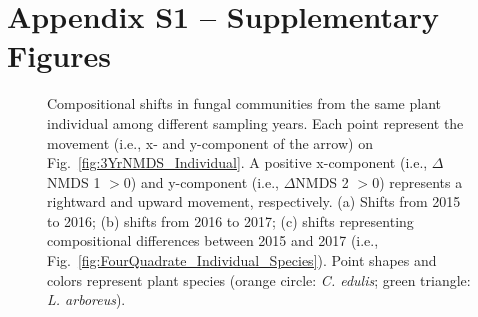 \section{Appendix S1 -- Supplementary Figures}
\clearpage
\begin{figure}
	\centering
	\caption[Compositional shifts in fungal communities from the same plant individual among different sampling years.]
		{\hspace{1mm} Compositional shifts in fungal communities from the same plant individual among different sampling years. Each point represent the movement (i.e., x- and y-component of the arrow) on Fig.~\ref{fig:3YrNMDS_Individual}. A positive x-component (i.e., $\Delta$NMDS 1 $ > 0$) and y-component (i.e., $\Delta$NMDS 2 $ > 0$) represents a rightward and upward movement, respectively. (a) Shifts from 2015 to 2016; (b) shifts from 2016 to 2017; (c) shifts representing compositional differences between 2015 and 2017 (i.e., Fig.~\ref{fig:FourQuadrate_Individual_Species}). Point shapes and colors represent plant species (orange circle: \textit{C. edulis}; green triangle: \textit{L. arboreus}). 
		}
	\label{fig:FourQuadrate_Individual_Species_SI}
\end{figure}




